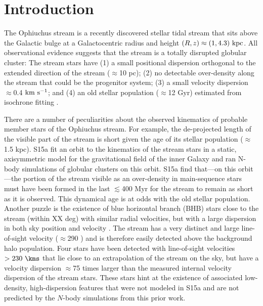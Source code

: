 \documentclass[letterpaper,12pt,preprint]{aastex}
\begin{document}

\section{Introduction}\label{sec:introduction}

The Ophiuchus stream \citep{bernard14, sesar15a} is a recently discovered stellar tidal stream that sits above the Galactic bulge at a Galactocentric radius and height $(R,z) \approx (1, 4.3)~{\rm kpc}$. All observational evidence suggests that the stream is a totally disrupted globular cluster: The stream stars have (1) a small positional dispersion orthogonal to the extended direction of the stream ($\approx$10 pc); (2) no detectable over-density along the stream that could be the progenitor system; (3) a small velocity dispersion $\approx$0.4 ${\rm km}~{\rm s}^{-1}$; and (4) an old stellar population ($\approx$12 Gyr) estimated from isochrone fitting \citep[][hereafter S15a]{sesar15a}. 

There are a number of peculiarities about the observed kinematics of probable member stars of the Ophiuchus stream. For example, the de-projected length of the visible part of the stream is short given the age of its stellar population ($\approx$1.5 kpc). S15a fit an orbit to the kinematics of the stream stars in a static, axisymmetric model for the gravitational field of the inner Galaxy and ran N-body simulations of globular clusters on this orbit. S15a find that---on this orbit---the portion of the stream visible as an over-density in main-sequence stars must have been formed in the last $\lesssim$400 Myr for the stream to remain as short as it is observed. This dynamical age is at odds with the old stellar population. Another puzzle is the existence of blue horizontal branch (BHB) stars close to the stream (within XX deg) with similar radial velocities, but with a large dispersion in both sky position and velocity \citep[][hereafter S15b]{sesar15b}. The stream has a very distinct and large line-of-sight velocity ($\approx$290 \kms) and is therefore easily detected above the background halo population. Four stars have been detected with line-of-sight velocities $>230~\kms$ that lie close to an extrapolation of the stream on the sky, but have a velocity dispersion $\approx$75 times larger than the measured internal velocity dispersion of the stream stars. These stars hint at the existence of associated low-density, high-dispersion features that were not modeled in S15a and are not predicted by the $N$-body simulations from this prior work.
\end{document}
